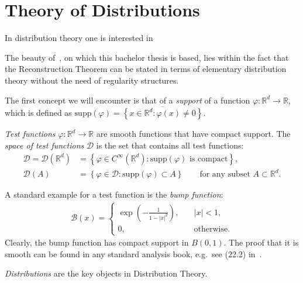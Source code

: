 
\section{Theory of Distributions}\label{chapter:distributions}

In distribution theory one is interested in 

The beauty of~\cite{caravenna2021hairer}, on which this bachelor thesis is based, lies within the fact that the Reconstruction Theorem can be stated in terms of elementary distribution theory without the need of regularity structures. 

The first concept we will encounter is that of a \emph{support} of a function \(\varphi: \mathbb{R}^d \to \mathbb{R}\), which is defined as \(\mathrm{supp}(\varphi) = \overline{\left \{ x \in \mathbb{R}^d : \varphi(x) \neq 0 \right \}}\). 

\begin{definition}
    \emph{Test functions} \(\varphi: \mathbb{R}^d \to \mathbb{R}\) are smooth functions that have compact support. The \emph{space of test functions} \(\mathcal{D}\) is the set that contains all test functions:
    \begin{align*}
        \mathcal{D} = \mathcal{D}(\mathbb{R}^d) &= \left \{ \varphi \in C^\infty(\mathbb{R}^d) : \text{\(\mathrm{supp}(\varphi)\) is compact} \right \}, \\
        \mathcal{D}(A) &= \left \{ \varphi \in \mathcal{D} : \mathrm{supp}(\varphi) \subset A \right \} \qquad \text{for any subset \(A \subset \mathbb{R}^d\).}
    \end{align*}
\end{definition}

A standard example for a test function is the \emph{bump function}:
\begin{align*}
    \mathcal{B}(x) = \begin{cases}
        \exp{\left( -\frac{1}{1 - |x|^2} \right)}, \quad & |x| < 1, \\
        0, & \text{otherwise}.
    \end{cases}
\end{align*}
Clearly, the bump function has compact support in \(B(0,1)\). The proof that it is smooth can be found in any standard analysis book, e.g.\ see (22.2) in~\cite{Forster_2016}.

\emph{Distributions} are the key objects in Distribution Theory.

